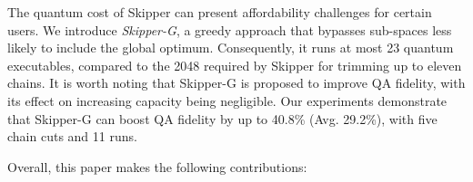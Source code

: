 

The quantum cost of Skipper can present affordability challenges for certain users. 
We introduce \emph{Skipper-G}, a greedy approach that bypasses sub-spaces less likely to include the global optimum. 
Consequently, it runs at most 23 quantum executables, compared to the 2048 required by Skipper for trimming up to eleven chains.
It is worth noting that Skipper-G is proposed to improve QA fidelity, with its effect on increasing capacity being negligible.
Our experiments demonstrate that Skipper-G can boost QA fidelity by up to 40.8\% (Avg. 29.2\%), with five chain cuts and 11 runs.

    
\vspace{0.1 in}
Overall, this paper makes the following contributions:
\vspace{0.05 in}

